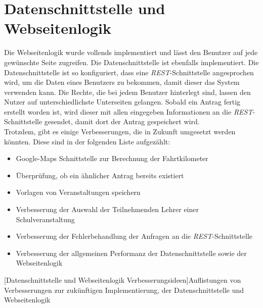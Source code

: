 \section{Datenschnittstelle und Webseitenlogik}
Die Webseitenlogik wurde vollends implementiert und lässt den Benutzer auf jede gewünschte Seite zugreifen. Die Datenschnittstelle ist ebenfalls implementiert. Die Datenschnittstelle ist so konfiguriert, dass eine \textit{REST}-Schnittstelle angesprochen wird, um die Daten eines Benutzers zu bekommen, damit dieser das System verwenden kann. Die Rechte, die bei jedem Benutzer hinterlegt sind, lassen den Nutzer auf unterschiedlichste Unterseiten gelangen. Sobald ein Antrag fertig erstellt worden ist, wird dieser mit allen eingegeben Informationen an die \textit{REST}-Schnittstelle gesendet, damit dort der Antrag gespeichert wird.\\

Trotzdem, gibt es einige Verbesserungen, die in Zukunft umgesetzt werden könnten. Diese sind in der folgenden Liste aufgezählt:
\begin{itemize}
	\item Google-Maps Schnittstelle zur Berechnung der Fahrtkilometer
	\item Überprüfung, ob ein ähnlicher Antrag bereits existiert
	\item Vorlagen von Veranstaltungen speichern
	\item Verbesserung der Auswahl der Teilnehmenden Lehrer einer Schulveranstaltung
	\item Verbesserung der Fehlerbehandlung der Anfragen an die \textit{REST}-Schnittstelle
	\item Verbesserung der allgemeinen Performanz der Datenschnittstelle sowie der Webseitenlogik
\end{itemize}
[Datenschnittstelle und Webseitenlogik Verbesserungsideen]{Auflistungen von Verbesserungen zur zukünftigen Implementierung, der Datenschnittstelle und Webseitenlogik}